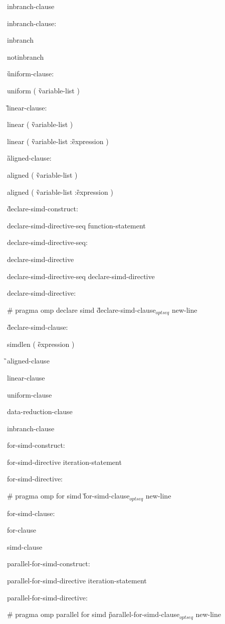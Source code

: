 {\I inbranch-clause

inbranch-clause:

\C\I inbranch

\I notinbranch

\G uniform-clause:

\C\I uniform ( \G variable-list \C )

\G linear-clause:

\C\I linear ( \G variable-list \C )

\C\I linear ( \G variable-list \C :\G expression \C )

\G aligned-clause:

\C\I aligned ( \G variable-list \C )

\I aligned ( \G variable-list \C :\G expression \C )

\G declare-simd-construct:

\I declare-simd-directive-seq function-statement

declare-simd-directive-seq:

\I declare-simd-directive

\I declare-simd-directive-seq declare-simd-directive

declare-simd-directive:

\C\I \# pragma omp declare simd \G declare-simd-clause$_{optseq}$ new-line

\G declare-simd-clause:

\C\I simdlen ( \G expression \C )

\G\I aligned-clause

\I linear-clause

\I uniform-clause

\I data-reduction-clause

\I inbranch-clause

for-simd-construct:

\I for-simd-directive iteration-statement

for-simd-directive:

\C\I \# pragma omp for simd \G for-simd-clause$_{optseq}$ new-line

for-simd-clause:

\I for-clause

\I simd-clause

parallel-for-simd-construct:

\I parallel-for-simd-directive iteration-statement

parallel-for-simd-directive:

\C\I \# pragma omp parallel for simd \G parallel-for-simd-clause$_{optseq}$ new-line

}
